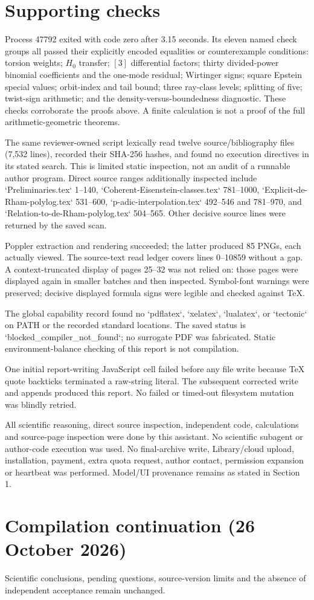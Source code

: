 \documentclass[10pt]{article}
\begin{document}
\section*{Supporting checks}
Process 47792 exited with code zero after 3.15 seconds. Its eleven named check groups all passed their explicitly encoded equalities or counterexample conditions: torsion weights; \(H_0\) transfer; \([3]\) differential factors; thirty divided-power binomial coefficients and the one-mode residual; Wirtinger signs; square Epstein special values; orbit-index and tail bound; three ray-class levels; splitting of five; twist-sign arithmetic; and the density-versus-boundedness diagnostic. These checks corroborate the proofs above. A finite calculation is not a proof of the full arithmetic-geometric theorems.\par
The same reviewer-owned script lexically read twelve source/bibliography files (7,532 lines), recorded their SHA-256 hashes, and found no execution directives in its stated search. This is limited static inspection, not an audit of a runnable author program. Direct source ranges additionally inspected include `Preliminaries.tex` 1–140, `Coherent-Eisenstein-classes.tex` 781–1000, `Explicit-de-Rham-polylog.tex` 531–600, `p-adic-interpolation.tex` 492–546 and 781–970, and `Relation-to-de-Rham-polylog.tex` 504–565. Other decisive source lines were returned by the saved scan.\par
Poppler extraction and rendering succeeded; the latter produced 85 PNGs, each actually viewed. The source-text read ledger covers lines 0–10859 without a gap. A context-truncated display of pages 25–32 was not relied on: those pages were displayed again in smaller batches and then inspected. Symbol-font warnings were preserved; decisive displayed formula signs were legible and checked against TeX.\par
The global capability record found no `pdflatex`, `xelatex`, `lualatex`, or `tectonic` on PATH or the recorded standard locations. The saved status is `blocked\_compiler\_not\_found`; no surrogate PDF was fabricated. Static environment-balance checking of this report is not compilation.\par
One initial report-writing JavaScript cell failed before any file write because TeX quote backticks terminated a raw-string literal. The subsequent corrected write and appends produced this report. No failed or timed-out filesystem mutation was blindly retried.\par
All scientific reasoning, direct source inspection, independent code, calculations and source-page inspection were done by this assistant. No scientific subagent or author-code execution was used. No final-archive write, Library/cloud upload, installation, payment, extra quota request, author contact, permission expansion or heartbeat was performed. Model/UI provenance remains as stated in Section 1.\par
\section*{Compilation continuation (26 October 2026)}
Scientific conclusions, pending questions, source-version limits and the absence of independent acceptance remain unchanged.\par
\end{document}
